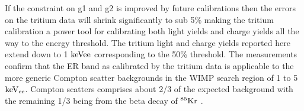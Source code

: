 If the constraint on g1 and g2 is improved by future calibrations then the errors on the tritium data will shrink significantly to sub 5\% making the tritium calibration a power tool for calibrating both light yields and charge yields all the way to the energy threshold. The tritium light and charge yields reported here extend down to 1 $\rm keVee$ corresponding to the 50\% threshold. The measurements confirm that the ER band as calibrated by the tritium data is applicable to the more generic Compton scatter backgrounds in the WIMP search region of 1 to 5 $\rm keV_{ee}$. Compton scatters comprises about 2/3 of the expected background with the remaining 1/3 being from the beta decay of $\rm ^{85}Kr$ \cite{LUX_BG}.

